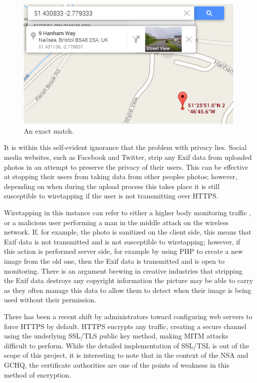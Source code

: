 \begin{figure}[htb!]
\centering\includegraphics{intro/diagrams/g-maps-location.png}
\caption{An exact match.}
\label{gmaps}
\end{figure}

It is within this self-evident ignorance that the problem with privacy lies. Social media websites, such as Facebook and Twitter, strip any Exif data \cite{intro:twitter_exif} from uploaded photos in an attempt to preserve the privacy of their users. This can be effective at stopping their users from taking data from other peoples photos; however, depending on when during the upload process this takes place it is still susceptible to wiretapping if the user is not transmitting over HTTPS. 

Wiretapping in this instance can refer to either a higher body monitoring traffic \cite{intro:room_641a}, or a malicious user performing a man in the middle attack on the wireless network. If, for example, the photo is sanitized on the client side, this means that Exif data is not transmitted and is not susceptible to wiretapping; however, if this action is performed server side, for example by using PHP to create a new image from the old one, then the Exif data is transmitted and is open to monitoring. There is an argument brewing in creative industries that stripping the Exif data destroys any copyright information the picture may be able to carry as they often manage this data to allow them to detect when their image is being used without their permission.

There has been a recent shift by administrators toward configuring web servers to force HTTPS by default. HTTPS encrypts any traffic, creating a secure channel using the underlying SSL/TLS public key method, making MITM attacks difficult to perform. While the detailed implementation of SSL/TSL is out of the scope of this project, it is interesting to note that in the context of the NSA and GCHQ, the certificate authorities are one of the points of weakness in this method of encryption. 


